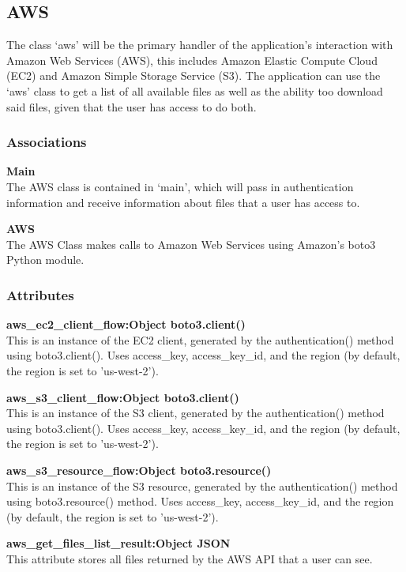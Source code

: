 \subsection{AWS}
The class `aws' will be the primary handler of the application's interaction with Amazon Web Services (AWS),
this includes Amazon Elastic Compute Cloud (EC2) and Amazon Simple Storage Service (S3). The application
can use the `aws' class to get a list of all available files as well as the ability too download said files, 
given that the user has access to do both.

\subsubsection{Associations}
\textbf{Main} \\
	The AWS class is contained in `main', which will pass in authentication information and receive information about files 
	that a user has access to.

\textbf{AWS} \\
	The AWS Class makes calls to Amazon Web Services using Amazon's boto3 Python module.

\subsubsection{Attributes}
\textbf{aws\_ec2\_client\_flow:Object boto3.client()} \\
    This is an instance of the EC2 client, generated by the authentication() method using boto3.client(). Uses access\_key, access\_key\_id, and the region (by default, the region is set to 'us-west-2'). 

\textbf{aws\_s3\_client\_flow:Object boto3.client()} \\
    This is an instance of the S3 client, generated by the authentication() method using boto3.client(). Uses access\_key, access\_key\_id, and the region (by default, the region is set to 'us-west-2').

\textbf{aws\_s3\_resource\_flow:Object boto3.resource()} \\
    This is an instance of the S3 resource, generated by the authentication() method using boto3.resource() method. Uses access\_key, access\_key\_id, and the region (by default, the region is set to 'us-west-2').

\textbf{aws\_get\_files\_list\_result:Object JSON} \\
    This attribute stores all files returned by the AWS API that a user can see.


